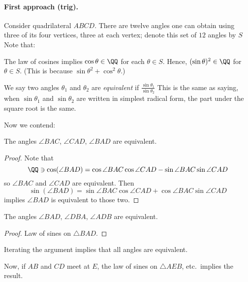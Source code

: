 \documentclass[11pt]{scrartcl}
\begin{document}
\paragraph{First approach (trig).}
Consider quadrilateral $ABCD$.
There are twelve angles one can obtain using three of its four vertices,
three at each vertex; denote this set of $12$ angles by $S$
Note that:
\begin{itemize}
  \ii The law of cosines implies $\cos \theta \in \QQ$ for each $\theta \in S$.
  \ii Hence, $(\sin \theta)^2 \in \QQ$ for $\theta \in S$.
  (This is because $\sin\theta^2+\cos^2\theta$.)
\end{itemize}
We say two angles $\theta_1$ and $\theta_2$ are
\emph{equivalent} if $\frac{\sin \theta_1}{\sin \theta_2}$
This is the same as saying,
when $\sin\theta_1$ and $\sin\theta_2$ are written in simplest radical form,
the part under the square root is the same.

Now we contend:
\begin{claim*}
  The angles $\angle BAC$, $\angle CAD$, $\angle BAD$ are equivalent.
\end{claim*}
\begin{proof}
  Note that
  \[ \QQ \ni \cos(\angle BAD) = \cos \angle BAC \cos \angle CAD - \sin \angle BAC \sin \angle CAD \]
  so $\angle BAC$ and $\angle CAD$ are equivalent.
  Then
  \[ \sin (\angle BAD) = \sin \angle BAC \cos \angle CAD + \cos \angle BAC \sin \angle CAD \]
  implies $\angle BAD$ is equivalent to those two.
\end{proof}

\begin{claim*}
  The angles $\angle BAD$, $\angle DBA$, $\angle ADB$ are equivalent.
\end{claim*}
\begin{proof}
  Law of sines on $\triangle BAD$.
\end{proof}

Iterating the argument implies that all angles are equivalent.

Now, if $AB$ and $CD$ meet at $E$,
the law of sines on $\triangle AEB$, etc.\ implies the result.
\end{document}
